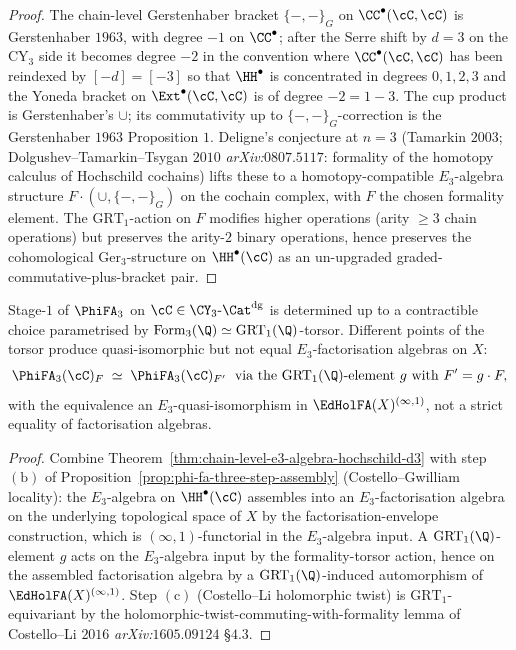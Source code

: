 \begin{proof}[Proof]
The chain-level Gerstenhaber bracket $\{-, -\}_G$ on
$\CC^\bullet(\cC, \cC)$ is Gerstenhaber $1963$, with degree $-1$ on
$\CC^\bullet$; after the Serre shift by $d = 3$ on the CY$_3$ side it
becomes degree $-2$ in the convention where $\CC^\bullet(\cC, \cC)$
has been reindexed by $[-d] = [-3]$ so that $\HH^\bullet$ is
concentrated in degrees $0, 1, 2, 3$ and the Yoneda bracket on
$\Ext^\bullet(\cC, \cC)$ is of degree $-2 = 1 - 3$. The cup product is
Gerstenhaber's $\cup$; its commutativity up to $\{-,-\}_G$-correction is
the Gerstenhaber $1963$ Proposition $1$. Deligne's conjecture at
$n = 3$ (Tamarkin $2003$; Dolgushev--Tamarkin--Tsygan $2010$
\textit{arXiv:$0807.5117$}: formality of the homotopy calculus of
Hochschild cochains) lifts these to a homotopy-compatible
$E_3$-algebra structure $F \cdot (\cup, \{-,-\}_G)$ on the cochain
complex, with $F$ the chosen formality element. The $\mathrm{GRT}_1$-action
on $F$ modifies higher operations (arity $\geq 3$ chain operations) but
preserves the arity-$2$ binary operations, hence preserves the
cohomological $\mathrm{Ger}_3$-structure on $\HH^\bullet(\cC)$ as an
un-upgraded graded-commutative-plus-bracket pair.
\end{proof}

\begin{corollary}
\label{cor:phifa3-stage-1-pinning-torsor}
\ClaimStatusTheorem
Stage-$1$ of $\PhiFA_3$ on $\cC \in \CY_3\text{-}\Cat^{\mathrm{dg}}$
is determined up to a contractible choice parametrised by
$\mathrm{Form}_3(\Q) \simeq \mathrm{GRT}_1(\Q)$-torsor. Different
points of the torsor produce quasi-isomorphic but not equal
$E_3$-factorisation algebras on $X$:
\[
 \PhiFA_3(\cC)_F \;\simeq\; \PhiFA_3(\cC)_{F'} \;\text{ via the } \mathrm{GRT}_1(\Q)\text{-element }
 g \text{ with } F' = g \cdot F,
\]
with the equivalence an $E_3$-quasi-isomorphism in
$\EdHolFA(X)^{(\infty,1)}$, not a strict equality of factorisation
algebras.
\end{corollary}

\begin{proof}
Combine Theorem~\ref{thm:chain-level-e3-algebra-hochschild-d3} with
step $(\mathrm{b})$ of Proposition~\ref{prop:phi-fa-three-step-assembly}
(Costello--Gwilliam locality): the $E_3$-algebra on $\HH^\bullet(\cC)$
assembles into an $E_3$-factorisation algebra on the underlying
topological space of $X$ by the factorisation-envelope construction,
which is $(\infty,1)$-functorial in the $E_3$-algebra input. A
$\mathrm{GRT}_1(\Q)$-element $g$ acts on the $E_3$-algebra input by the
formality-torsor action, hence on the assembled factorisation algebra
by a $\mathrm{GRT}_1(\Q)$-induced automorphism of
$\EdHolFA(X)^{(\infty,1)}$. Step $(\mathrm{c})$
(Costello--Li holomorphic twist) is $\mathrm{GRT}_1$-equivariant by the
holomorphic-twist-commuting-with-formality lemma of Costello--Li $2016$
\textit{arXiv:$1605.09124$} §$4.3$.
\end{proof}

